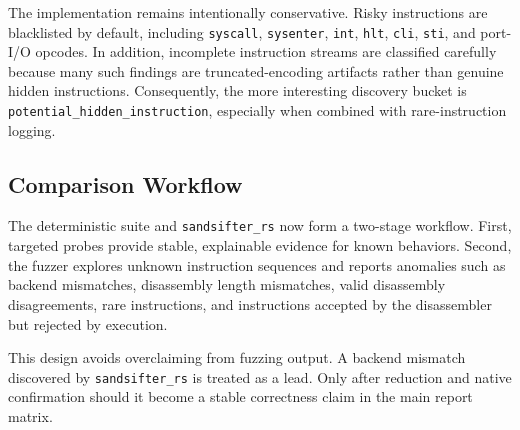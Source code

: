 The implementation remains intentionally conservative. Risky instructions are blacklisted by default, including \texttt{syscall}, \texttt{sysenter}, \texttt{int}, \texttt{hlt}, \texttt{cli}, \texttt{sti}, and port-I/O opcodes. In addition, incomplete instruction streams are classified carefully because many such findings are truncated-encoding artifacts rather than genuine hidden instructions. Consequently, the more interesting discovery bucket is \texttt{potential\_hidden\_instruction}, especially when combined with rare-instruction logging.

\subsection{Comparison Workflow}

The deterministic suite and \texttt{sandsifter\_rs} now form a two-stage workflow. First, targeted probes provide stable, explainable evidence for known behaviors. Second, the fuzzer explores unknown instruction sequences and reports anomalies such as backend mismatches, disassembly length mismatches, valid disassembly disagreements, rare instructions, and instructions accepted by the disassembler but rejected by execution.

This design avoids overclaiming from fuzzing output. A backend mismatch discovered by \texttt{sandsifter\_rs} is treated as a lead. Only after reduction and native confirmation should it become a stable correctness claim in the main report matrix.
